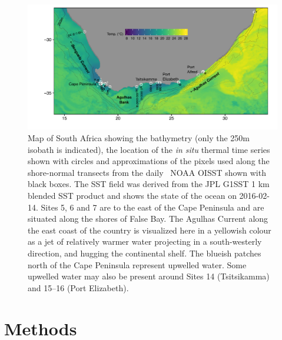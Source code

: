 \documentclass[a4paper,10pt,review]{elsarticle}
\begin{document}
\begin{figure}
\includegraphics[width=1.0\textwidth]{figure1_1km_labeled.pdf}
\caption{Map of South Africa showing the bathymetry (only the 250m isobath is indicated), the location of the \emph{in situ} thermal time series shown with circles and approximations of the pixels used along the shore-normal transects from the daily \degree~NOAA OISST \cite{Reynolds2007} shown with black boxes. The SST field was derived from the JPL G1SST 1 km blended SST product and shows the state of the ocean on 2016-02-14. Sites 5, 6 and 7 are to the east of the Cape Peninsula and are situated along the shores of False Bay. The Agulhas Current along the east coast of the country is visualized here in a yellowish colour as a jet of relatively warmer water projecting in a south-westerly direction, and hugging the continental shelf. The blueish patches north of the Cape Peninsula represent upwelled water. Some upwelled water may also be present around Sites 14 (Tsitsikamma) and 15--16 (Port Elizabeth).} \label{fig:Figure1}
\end{figure}

\section{Methods}
\end{document}
